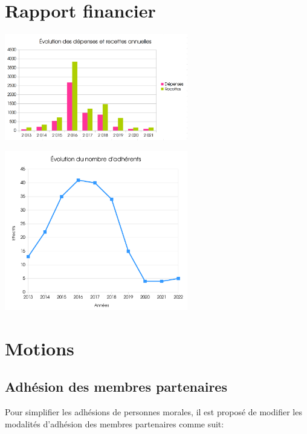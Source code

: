 \documentclass[11pt]{article}
\begin{document}
\section{Rapport financier}

\begin{center}




\begin{multicols}{2}
\includegraphics[width=8cm]{3DossierAGGeneral2021.png}

\includegraphics[width=8cm]{4DossierAGAdherents2021.png}
\end{multicols}
\end{center}

\section{Motions}

\subsection{Adhésion des membres partenaires}

Pour simplifier les adhésions de personnes morales, il est proposé de modifier 
les modalités d'adhésion des membres partenaires comme suit:
\end{document}
